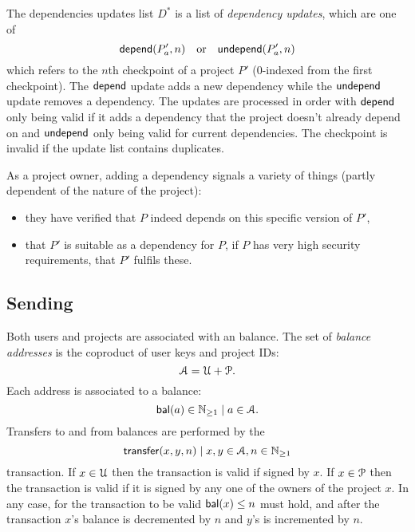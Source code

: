 The dependencies updates list $D^*$ is a list of \emph{dependency
  updates}, which are one of
\[
    \mathsf{depend}(P'_a, n) \quad \text{or} \quad \mathsf{undepend}(P'_a, n)
\]
which refers to the $n$th checkpoint of a project $P'$ ($0$-indexed
from the first checkpoint). The $\mathsf{depend}$ update adds a new dependency
while the $\mathsf{undepend}$ update removes a dependency. The updates are
processed in order with $\mathsf{depend}$ only being valid if it adds a
dependency that the project doesn't already depend on and $\mathsf{undepend}$
only being valid for current dependencies. The checkpoint is invalid
if the update list contains duplicates.

As a project owner, adding a dependency signals a variety of things
(partly dependent of the nature of the project):
\begin{itemize}
\item they have verified that $P$ indeed depends on this specific
  version of $P'$,
\item that $P'$ is suitable as a dependency for $P$, \eg{} if $P$ has
  very high security requirements, that $P'$ fulfils these.
\end{itemize}


\def\posnat{\mathbb{N}_{\geq 1}}

\subsection{Sending \oscoin{}}
\label{s:sending}

Both users and projects are associated with an \oscoin{} balance.  The
set of \emph{balance addresses} is the coproduct of user keys and
project IDs:
\[
\mathcal{A} = \mathcal{U} + \mathcal{P}.
\]
Each address is associated to a balance:
\[
\bal(a) \in \posnat \mid a \in \accAddrs.
\]
Transfers to and from balances are performed by the
\[
\mathsf{transfer}\small{\lparen x,y,n\rparen} \mid x,y \in \mathcal{A}, n \in \mathbb{N}_{\geq 1}
\]
transaction. If $x \in \mathcal{U}$ then the transaction is valid if signed
by $x$. If $x \in \mathcal{P}$ then the transaction is valid if it is
signed by any one of the owners of the project $x$. In any case, for
the transaction to be valid $\mathsf{bal}(x) \leq n$ must hold, and after the
transaction $x$'s balance is decremented by $n$ and $y$'s is
incremented by $n$.

